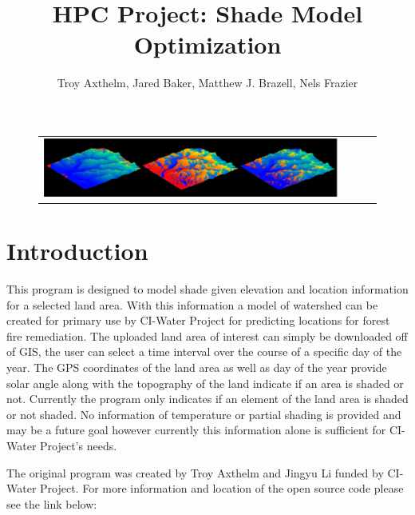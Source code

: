 \documentclass[]{article}%
\title{HPC Project: Shade Model Optimization}
\author{Troy Axthelm, Jared Baker, Matthew J. Brazell, Nels Frazier}
\begin{document}
\maketitle
\begin{figure}[H]
\centering
  \begin{tabular}{@{}cccc@{}}
    \includegraphics[width=.75\textwidth]{./figures/titleBar.png} 
  \end{tabular}
  \caption{}
  \label{}
\end{figure}


\listoffigures


\section{Introduction}


This program is designed to model shade given elevation and location information for a selected land area. With this information a model of watershed can be created for primary use by CI-Water Project for predicting locations for forest fire remediation. The uploaded land area of interest can simply be downloaded off of GIS, the user can select a time interval over the course of a specific day of the year. The GPS coordinates of the land area as well as day of the year provide solar angle along with the topography of the land indicate if an area is shaded or not. Currently the program  only indicates if an element of the land area is shaded or not shaded. No information of temperature or partial shading is provided and may be a future goal however currently this information alone is sufficient for CI-Water Project's needs.

The original program was created by Troy Axthelm and Jingyu Li  funded by CI-Water Project. For more information and location of the open source code please see the link below:
\end{document}
